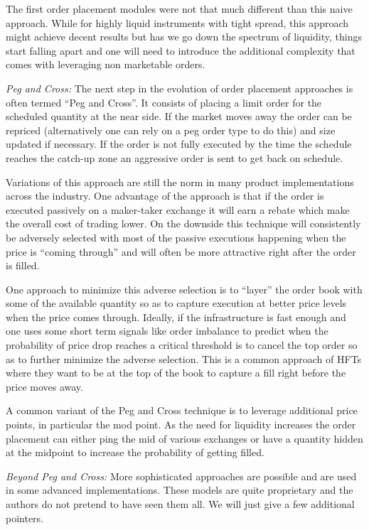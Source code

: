 The first order placement modules were not that much different than this naive approach. While for highly liquid instruments with tight spread, this approach might achieve decent results but has we go down the spectrum of liquidity, things start falling apart and one will need to introduce the additional complexity that comes with leveraging non marketable orders. \twomedskip


\noindent\emph{Peg and Cross:} The next step in the evolution of order placement approaches is often termed ``Peg and Cross''. It consists of placing a limit order  for the scheduled quantity at the near side. If the market moves away the order can be repriced (alternatively one can rely on a peg order type to do this) and size updated if necessary. If the order is not fully executed by the time the schedule reaches the catch-up zone an aggressive order is sent to get back on schedule.


Variations of this approach are still the norm in many product implementations across the industry. One advantage of the approach is that if  the order is executed passively on a maker-taker exchange it will earn a rebate which make the overall cost of trading lower. On the downside this technique will consistently be adversely selected with most of the passive executions happening when the price is ``coming through'' and will often be more attractive right after the order is filled.


One approach to minimize this adverse selection is to ``layer'' the order book with some of the available quantity so as to capture execution at better price levels when the price comes through. Ideally, if the infrastructure is fast enough and one uses some short term signals like order imbalance to predict when the probability of price drop reaches a critical threshold is to cancel the top order so as to further minimize the adverse selection. This is a common approach of HFTs where they want to be at the top of the book to capture a fill right before the price moves away.


A common variant of the Peg and Cross technique is to leverage additional price points, in particular the mod point. As the need for liquidity increases the order placement can either ping the mid of various exchanges or have a quantity hidden at the midpoint to increase the probability of getting filled. \twomedskip


\noindent\emph{Beyond Peg and Cross:} More sophisticated approaches are possible and are used in some advanced implementations. These models are quite proprietary and the authors do not pretend to have seen them all. We will just give a few additional pointers.


